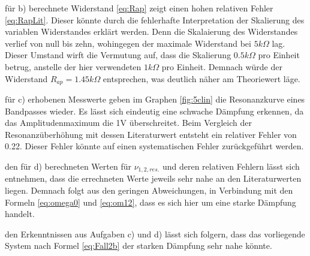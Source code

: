 \justifying für b) berechnete Widerstand \eqref{eq:Rap} zeigt einen hohen relativen Fehler \eqref{eq:RapLit}. 
Dieser könnte durch die fehlerhafte Interpretation der Skalierung des variablen Widerstandes erklärt werden. Denn die Skalaierung 
des Widerstandes verlief von null bis zehn, wohingegen der maximale Widerstand bei $5k\Omega$ lag. Dieser Umstand wirft die 
Vermutung auf, dass die Skalierung $0.5k\Omega$ pro Einheit betrug, anstelle der hier verwendeten $1k\Omega$ pro Einheit. Demnach 
würde der Widerstand $R_{ap} = 1.45k\Omega$ entsprechen, was deutlich näher am Theoriewert läge.

\justifying für c) erhobenen Messwerte geben im Graphen \ref{fig:5clin} die Resonanzkurve eines Bandpasses wieder. 
Es lässt sich eindeutig eine schwache Dämpfung erkennen, da das Amplitudenmaximum die 1V überschreitet. Beim Vergleich der 
Resonanzüberhöhung mit dessen Literaturwert entsteht ein relativer Fehler von 0.22. Dieser Fehler könnte auf einen systematischen 
Fehler zurückgeführt werden. 

\justifying den für d) berechneten Werten für $\nu_{1,2,res.}$ und deren relativen Fehlern lässt sich entnehmen,
dass die errechneten Werte jeweils sehr nahe an den Literaturwerten liegen. Demnach folgt aus den geringen Abweichungen, in 
Verbindung mit den Formeln \eqref{eq:omega0} und \eqref{eq:om12}, dass es sich hier um eine starke Dämpfung handelt.

\justifying den Erkenntnissen aus Aufgaben c) und d) lässt sich folgern, dass das vorliegende System nach Formel 
\eqref{eq:Fall2b} der starken Dämpfung sehr nahe könnte.  

\newpage

\printbibliography





